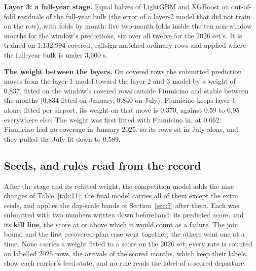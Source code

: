 \documentclass[
  manuscript=article,
  layout=preprint,
  year=2026,
  volume=x,
]{extra/joas}
\begin{document}
\textbf{Layer 3: a full-year stage.} Equal halves of LightGBM and XGBoost on out-of-fold residuals of the full-year bulk (the error of a layer-2 model that did not train on the row), with folds by month: five two-month folds inside the ten non-window months for the window's predictions, six over all twelve for the 2026 set's. It is trained on 1,132,994 covered, callsign-matched ordinary rows and applied where the full-year bulk is under 3,600 s.

\textbf{The weight between the layers.} On covered rows the submitted prediction moves from the layer-1 model toward the layer-2-and-3 model by a weight of 0.837, fitted on the window's covered rows outside Fiumicino and stable between the months (0.834 fitted on January, 0.840 on July). Fiumicino keeps layer 1 alone: fitted per airport, its weight on that move is 0.370, against 0.59 to 0.95 everywhere else. The weight was first fitted with Fiumicino in, at 0.662: Fiumicino had no coverage in January 2025, so its rows sit in July alone, and they pulled the July fit down to 0.589.

\subsection{Seeds, and rules read from the record}\label{sec:5.3}

After the stage and its refitted weight, the competition model adds the nine changes of Table~\ref{tab:11}; the final model carries all of them except the extra seeds, and applies the day-scale bands of Section~\ref{sec:7} after them. Each was submitted with two numbers written down beforehand: its predicted score, and its \textbf{kill line}, the score at or above which it would count as a failure. The join bound and the first recovered-plan case went together; the others went one at a time. None carries a weight fitted to a score on the 2026 set; every rate is counted on labelled 2025 rows, the arrivals of the scored months, which keep their labels, show each carrier's feed state, and no rule reads the label of a scored departure.
\end{document}
